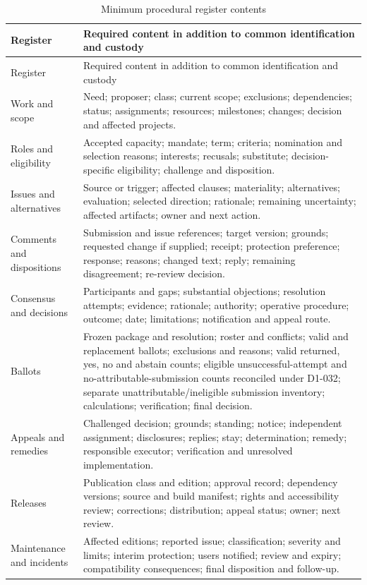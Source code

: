 \documentclass[11pt,a4paper]{article}
\begin{document}
\begin{longtable}{@{}L{0.23\textwidth}L{0.67\textwidth}@{}}
\caption{Minimum procedural register contents}\label{tab:d1-registers}\\
\toprule Register & Required content in addition to common identification and custody \\
\midrule\endfirsthead
\toprule Register & Required content in addition to common identification and custody \\
\midrule\endhead
Work and scope & Need; proposer; class; current scope; exclusions; dependencies; status; assignments; resources; milestones; changes; decision and affected projects. \\
Roles and eligibility & Accepted capacity; mandate; term; criteria; nomination and selection reasons; interests; recusals; substitute; decision-specific eligibility; challenge and disposition. \\
Issues and alternatives & Source or trigger; affected clauses; materiality; alternatives; evaluation; selected direction; rationale; remaining uncertainty; affected artifacts; owner and next action. \\
Comments and dispositions & Submission and issue references; target version; grounds; requested change if supplied; receipt; protection preference; response; reasons; changed text; reply; remaining disagreement; re-review decision. \\
Consensus and decisions & Participants and gaps; substantial objections; resolution attempts; evidence; rationale; authority; operative procedure; outcome; date; limitations; notification and appeal route. \\
Ballots & Frozen package and resolution; roster and conflicts; valid and replacement ballots; exclusions and reasons; valid returned, yes, no and abstain counts; eligible unsuccessful-attempt and no-attributable-submission counts reconciled under D1-032; separate unattributable/ineligible submission inventory; calculations; verification; final decision. \\
Appeals and remedies & Challenged decision; grounds; standing; notice; independent assignment; disclosures; replies; stay; determination; remedy; responsible executor; verification and unresolved implementation. \\
Releases & Publication class and edition; approval record; dependency versions; source and build manifest; rights and accessibility review; corrections; distribution; appeal status; owner; next review. \\
Maintenance and incidents & Affected editions; reported issue; classification; severity and limits; interim protection; users notified; review and expiry; compatibility consequences; final disposition and follow-up. \\
\bottomrule
\end{longtable}
\end{document}
